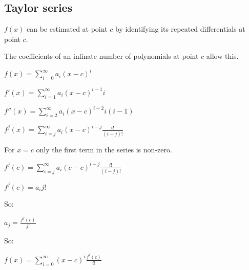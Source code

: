 
\subsection{Taylor series}


\(f(x)\) can be estimated at point \(c\) by identifying its repeated differentials at point \(c\).

The coefficients of an infinate number of polynomials at point \(c\) allow this.

$f(x)=\sum_{i=0}^{\infty }a_i(x-c)^i$

$f'(x)=\sum_{i=1}^{\infty }a_i(x-c)^{i-1}i$

$f''(x)=\sum_{i=2}^{\infty }a_i(x-c)^{i-2}i(i-1)$

$f^j(x)=\sum_{i=j}^{\infty }a_i(x-c)^{i-j}\frac{i!}{(i-j)!}$

For \(x=c\) only the first term in the series is non-zero.

$f^j(c)=\sum_{i=j}^{\infty }a_i(c-c)^{i-j}\frac{i!}{(i-j)!}$

$f^j(c)=a_ij!$

So:

$a_j=\frac{f^j(c)}{j!}$

So:

$f(x)=\sum_{i=0}^\infty (x-c)^i \frac{f^i(c)}{i!}$

